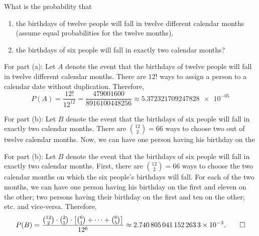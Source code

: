 \begin{problem}[Handout 2, \# 14]
  What is the probability that
  \begin{enumerate}[label=(\alph*),noitemsep]
  \item the birthdays of twelve people will fall in twelve different
    calendar months (assume equal probabilities for the twelve months),
  \item the birthdays of six people will fall in exactly two calendar
    months?
  \end{enumerate}
\end{problem}
\begin{solution*}
  For part (a): Let \(A\) denote the event that the birthdays of twelve
  people will fall in twelve different calendar months. There are \(12!\)
  ways to assign a person to a calendar date without
  duplication. Therefore,
  \[
    P(A)=\frac{12!}{12^{12}}= \frac{\num{479001600}}{\num{8916100448256}}
    \approx\num{5.372321709247828e-05}
  \]

  For part (b): Let \(B\) denote the event that the birthdays of six people
  will fall in exactly two calendar months. There are \(\binom{12}{2}=66\)
  ways to choose two out of twelve calendar months. Now, we can have one
  person having his birthday on the

  For part (b): Let \(B\) denote the event that the birthdays of six people
  will fall in exactly two calendar months. First, there are
  \(\binom{12}{2}=66\) ways to choose the two calendar months on which the
  six people's birthdays will fall. For each of the two months, we can have
  one person having his birthday on the first and eleven on the other; two
  persons having their birthday on the first and ten on the other; etc.\@
  and vice-versa. Therefore,
  \[
    P(B)=%
    \frac{\binom{12}{2}\cdot \binom{2}{1}%
      \cdot\left[\binom{6}{1}+\dotsb+\binom{6}{5}\right]}%
    {12^6}%
    \approx \num{2.7408050411522633e-03}.\qedhere
  \]
\end{solution*}

